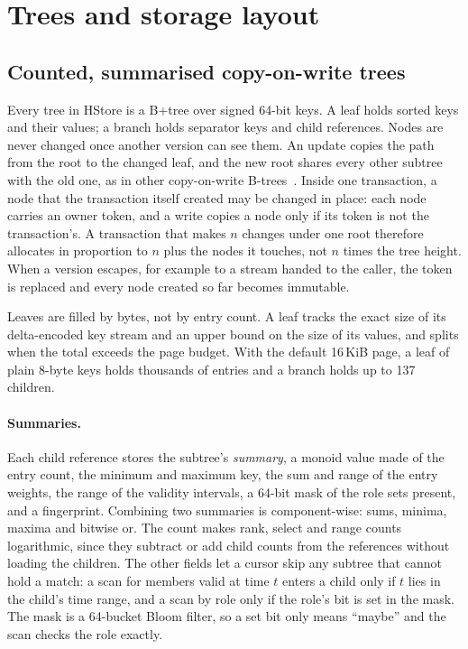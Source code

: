 \section{Trees and storage layout}
\label{sec:layout}

\subsection{Counted, summarised copy-on-write trees}
\label{sec:tree}

Every tree in HStore is a B+tree over signed 64-bit keys. A leaf holds sorted keys and their values; a branch holds separator keys and child references. Nodes are never changed once another version can see them. An update copies the path from the root to the changed leaf, and the new root shares every other subtree with the old one, as in other copy-on-write B-trees~\cite{lorie,rodeh-shadowing,lmdb}. Inside one transaction, a node that the transaction itself created may be changed in place: each node carries an owner token, and a write copies a node only if its token is not the transaction's. A transaction that makes $n$ changes under one root therefore allocates in proportion to $n$ plus the nodes it touches, not $n$ times the tree height. When a version escapes, for example to a stream handed to the caller, the token is replaced and every node created so far becomes immutable.

Leaves are filled by bytes, not by entry count. A leaf tracks the exact size of its delta-encoded key stream and an upper bound on the size of its values, and splits when the total exceeds the page budget. With the default 16\,KiB page, a leaf of plain 8-byte keys holds thousands of entries and a branch holds up to 137 children.

\paragraph{Summaries.} Each child reference stores the subtree's \emph{summary}, a monoid value made of the entry count, the minimum and maximum key, the sum and range of the entry weights, the range of the validity intervals, a 64-bit mask of the role sets present, and a fingerprint. Combining two summaries is component-wise: sums, minima, maxima and bitwise or. The count makes rank, select and range counts logarithmic, since they subtract or add child counts from the references without loading the children. The other fields let a cursor skip any subtree that cannot hold a match: a scan for members valid at time $t$ enters a child only if $t$ lies in the child's time range, and a scan by role only if the role's bit is set in the mask. The mask is a 64-bucket Bloom filter, so a set bit only means ``maybe'' and the scan checks the role exactly.

